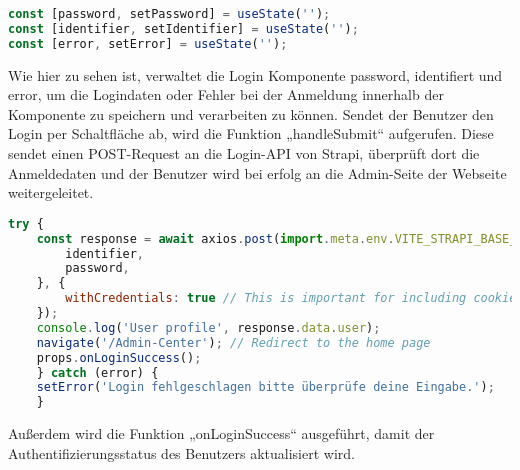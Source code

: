 \begin{lstlisting}[language=JavaScript, caption={Login.jsx states}, label={lst:loginjsxStates}]
const [password, setPassword] = useState('');
const [identifier, setIdentifier] = useState('');
const [error, setError] = useState('');
\end{lstlisting}

Wie hier zu sehen ist, verwaltet die Login Komponente password, identifiert und error, um die Logindaten oder Fehler bei der Anmeldung innerhalb der Komponente zu speichern und verarbeiten zu können.
Sendet der Benutzer den Login per Schaltfläche ab, wird die Funktion „handleSubmit“ aufgerufen. Diese sendet einen POST-Request an die Login-API von Strapi, überprüft dort die Anmeldedaten und der Benutzer wird bei erfolg an die Admin-Seite der Webseite weitergeleitet.

\begin{lstlisting}[language=JavaScript, caption={Login.jsx Login-Funktion}, label={lst:loginjsxLoginFunktion}]
try {
    const response = await axios.post(import.meta.env.VITE_STRAPI_BASE_URL+'api/auth/login', {
        identifier,
        password,
    }, {
        withCredentials: true // This is important for including cookies in the request
    });
    console.log('User profile', response.data.user);
    navigate('/Admin-Center'); // Redirect to the home page
    props.onLoginSuccess();
    } catch (error) {
    setError('Login fehlgeschlagen bitte überprüfe deine Eingabe.');
    }
\end{lstlisting}

Außerdem wird die Funktion „onLoginSuccess“ ausgeführt, damit der Authentifizierungsstatus des Benutzers aktualisiert wird.